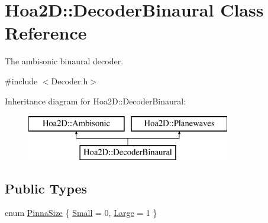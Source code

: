 \hypertarget{class_hoa2_d_1_1_decoder_binaural}{\section{Hoa2\-D\-:\-:Decoder\-Binaural Class Reference}
\label{class_hoa2_d_1_1_decoder_binaural}
}


The ambisonic binaural decoder.  




{\ttfamily \#include $<$Decoder.\-h$>$}

Inheritance diagram for Hoa2\-D\-:\-:Decoder\-Binaural\-:\begin{figure}[H]
\begin{center}
\leavevmode
\includegraphics[height=2.000000cm]{class_hoa2_d_1_1_decoder_binaural}
\end{center}
\end{figure}
\subsection*{Public Types}
\begin{DoxyCompactItemize}
\item 
enum \hyperlink{class_hoa2_d_1_1_decoder_binaural_a29505dfc8fda1797dc2b059530f2383a}{Pinna\-Size} \{ \hyperlink{class_hoa2_d_1_1_decoder_binaural_a29505dfc8fda1797dc2b059530f2383aa73b742cef9362a284ef7553f3c9ca507}{Small} = 0, 
\hyperlink{class_hoa2_d_1_1_decoder_binaural_a29505dfc8fda1797dc2b059530f2383aade3b787bd730bdf82e9b466dd3b246ac}{Large} = 1
 \}
\end{DoxyCompactItemize}
